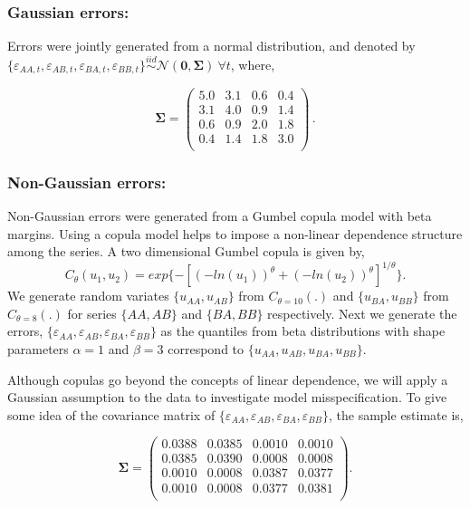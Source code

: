 \documentclass[12pt]{article}
\theoremstyle{definition}
\begin{document}
\subsubsection*{Gaussian errors:}

Errors were jointly generated from a normal distribution, and denoted by $\{\varepsilon_{AA,t},\varepsilon_{AB,t},\varepsilon_{BA,t},\varepsilon_{BB,t}\} \overset{iid}{\sim} \mathcal{N}(\bm{0}, \bm{\Sigma})~\forall t$, where,


\begin{equation}\label{eq:SigmaGaussian}
\bm{\Sigma} =
\begin{pmatrix}
5.0 & 3.1 & 0.6 & 0.4 \\
3.1 & 4.0 & 0.9 & 1.4 \\
0.6 & 0.9 & 2.0 & 1.8 \\
0.4 & 1.4 & 1.8 & 3.0 \\
\end{pmatrix}\,.
\end{equation}


\subsubsection*{Non-Gaussian errors:}

Non-Gaussian errors were generated from a Gumbel copula model with beta margins. Using a copula model helps to impose a non-linear dependence structure among the series. A two dimensional Gumbel copula is given by,
\begin{equation*}
C_\theta(u_1, u_2) = exp\{-[(-ln(u_1))^\theta + (-ln(u_2))^\theta]^{1/\theta}\}.
\end{equation*}
We generate random variates $\{u_{AA}, u_{AB}\}$ from $C_{\theta=10}(.)$ and $\{u_{BA}, u_{BB}\}$ from $C_{\theta=8}(.)$ for series $\{AA, AB\}$ and $\{BA, BB\}$ respectively. Next we generate the errors, $\{\varepsilon_{AA}, \varepsilon_{AB}, \varepsilon_{BA}, \varepsilon_{BB}\}$ as the quantiles from beta distributions with shape parameters $\alpha = 1$ and $\beta = 3$ correspond to $\{u_{AA}, u_{AB}, u_{BA}, u_{BB}\}$.

Although copulas go beyond the concepts of linear dependence, we will apply a Gaussian assumption to the data to investigate model misspecification. To give some idea of the covariance matrix of $\{\varepsilon_{AA}, \varepsilon_{AB}, \varepsilon_{BA}, \varepsilon_{BB}\}$, the sample estimate is,

\begin{equation} \label{eq:SigmaNonGauss}
\bm{\Sigma} = \begin{pmatrix}
0.0388 & 0.0385 & 0.0010 & 0.0010\\
0.0385 & 0.0390 & 0.0008 & 0.0008 \\
0.0010 & 0.0008 & 0.0387 & 0.0377 \\
0.0010 & 0.0008 & 0.0377 & 0.0381 \\
\end{pmatrix}.
\end{equation}
\end{document}
